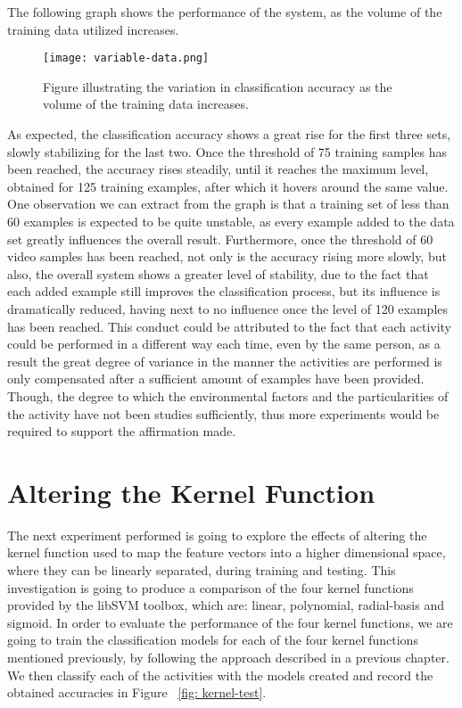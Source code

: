 \documentclass[11pt]{report}
\begin{document}
The following graph shows the performance of the system, as the volume of the training data utilized increases. 

\begin{figure}
    \centering
    \texttt{[image: variable-data.png]}
    \caption{Figure illustrating the variation in classification accuracy as the volume of the training data increases.}
    \label{fig:variable-data}
\end{figure}

As expected, the classification accuracy shows a great rise for the first three sets, slowly stabilizing for the last two. Once the threshold of 75 training samples has been reached, the accuracy rises steadily, until it reaches the maximum level, obtained for 125 training examples, after which it hovers around the same value. One observation we can extract from the graph is that a training set of less than 60 examples is expected to be quite unstable, as every example added to the data set greatly influences the overall result. Furthermore, once the threshold of 60 video samples has been reached, not only is the accuracy rising more slowly, but also, the overall system shows a greater level of stability, due to the fact that each added example still improves the classification process, but its influence is dramatically reduced, having next to no influence once the level of 120 examples has been reached. This conduct could be attributed to the fact that each activity could be performed in a different way each time, even by the same person, as a result the great degree of variance in the manner the activities are performed is only compensated after a sufficient amount of examples have been provided. Though, the degree to which the environmental factors and the particularities of the activity have not been studies sufficiently, thus more experiments would be required to support the affirmation made. \\

\section{Altering the Kernel Function}
The next experiment performed is going to explore the effects of altering the kernel function used to map the feature vectors into a higher dimensional space, where they can be linearly separated, during training and testing. This investigation is going to produce a comparison of the four kernel functions provided by the libSVM toolbox, which are: linear, polynomial, radial-basis and sigmoid. In order to evaluate the performance of the four kernel functions, we are going to train the classification models for each of the four kernel functions mentioned previously, by following the approach described in a previous chapter. We then classify each of the activities with the models created and record the obtained accuracies in Figure ~\ref{fig: kernel-test}.\\
\end{document}
